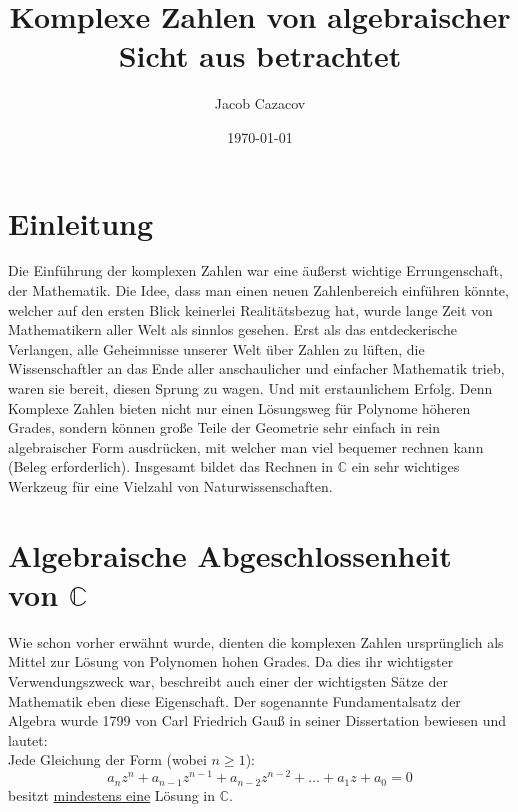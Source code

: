 \documentclass[a4paper,12pt]{article} %
\author{Jacob Cazacov}
\title{Komplexe Zahlen von algebraischer Sicht aus betrachtet}
\date{\today}
\begin{document}

\maketitle

\newpage

\tableofcontents

\newpage

\section{Einleitung}

Die Einführung der komplexen Zahlen war eine äußerst wichtige Errungenschaft, der Mathematik. Die Idee, dass man einen neuen Zahlenbereich einführen könnte, welcher auf den ersten Blick keinerlei Realitätsbezug hat, wurde lange Zeit von Mathematikern aller Welt als sinnlos gesehen. Erst als das entdeckerische Verlangen, alle Geheimnisse unserer Welt über Zahlen zu lüften, die Wissenschaftler an das Ende aller anschaulicher und einfacher Mathematik trieb, waren sie bereit, diesen Sprung zu wagen. Und mit erstaunlichem Erfolg. Denn Komplexe Zahlen bieten nicht nur einen Lösungsweg für Polynome höheren Grades, sondern können große Teile der Geometrie sehr einfach in rein algebraischer Form ausdrücken, mit welcher man viel bequemer rechnen kann (Beleg erforderlich). Insgesamt bildet das Rechnen in $\mathbb{C}$ ein sehr wichtiges Werkzeug für eine Vielzahl von Naturwissenschaften.

\section{Algebraische Abgeschlossenheit von $\mathbb{C}$}

Wie schon vorher erwähnt wurde, dienten die komplexen Zahlen ursprünglich als Mittel zur Lösung von Polynomen hohen Grades.
Da dies ihr wichtigster Verwendungszweck war, beschreibt auch einer der wichtigsten Sätze der Mathematik eben diese Eigenschaft.
Der sogenannte Fundamentalsatz der Algebra wurde 1799 von Carl Friedrich Gauß in seiner Dissertation bewiesen und lautet:\\


\noindent Jede Gleichung der Form (wobei $n \geq 1 $):
\begin{equation}\label{eq:funda}
\boxed{
a_nz^n + a_{n-1}z^{n-1} + a_{n-2}z^{n-2} + \dots + a_1z + a_0 = 0
}
\end{equation} 
besitzt \underline{mindestens eine} Lösung in $\mathbb{C}$.
\end{document}
